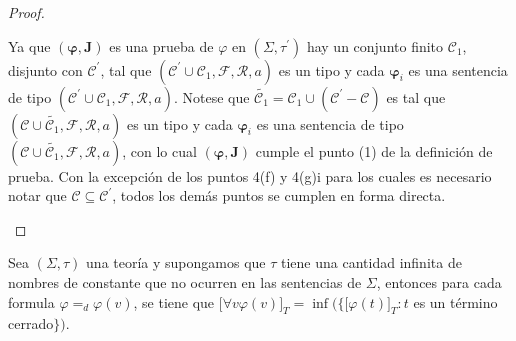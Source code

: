 \begin{proof}
\begin{enumerate}[(1)]
        \PN Ya que $(\mathbf{\varphi}, \mathbf{J})$ es una prueba de $\varphi$ en $(\Sigma, \tau^{\prime})$ hay un
        conjunto finito $\mathcal{C}_{1}$, disjunto con $\mathcal{C}^{\prime}$, tal que $(\mathcal{C}^{\prime} \cup
        \mathcal{C}_{1}, \mathcal{F}, \mathcal{R}, a)$ es un tipo y cada $\mathbf{\varphi}_{i}$ es una sentencia de tipo
        $(\mathcal{C}^{\prime} \cup \mathcal{C}_{1}, \mathcal{F}, \mathcal{R}, a)$. Notese que
        $\widetilde{\mathcal{C}_{1}} = \mathcal{C}_{1} \cup (\mathcal{C}^{\prime}-\mathcal{C})$ es tal que $(\mathcal{C}
        \cup \widetilde{\mathcal{C}_{1}}, \mathcal{F}, \mathcal{R}, a)$ es un tipo y cada $\mathbf{\varphi}_{i}$ es una
        sentencia de tipo $(\mathcal{C} \cup \widetilde{\mathcal{C}_{1}}, \mathcal{F}, \mathcal{R}, a)$, con lo cual
        $(\mathbf{\varphi}, \mathbf{J})$ cumple el punto (1) de la definición de prueba. Con la excepción de los puntos
        4(f) y 4(g)i para los cuales es necesario notar que $\mathcal{C} \subseteq \mathcal{C}^{\prime}$, todos los
        demás puntos se cumplen en forma directa.
    \end{enumerate}
  \end{proof}

  \begin{lemma} \label{lemma_79}
    \PN Sea $(\Sigma, \tau)$ una teoría y supongamos que $\tau$ tiene una cantidad infinita de nombres de constante que
    no ocurren en las sentencias de $\Sigma$, entonces para cada formula $\varphi =_{d} \varphi(v)$, se tiene que
    $\lbrack \forall v\varphi (v) \rbrack_{T} = \inf(\{\lbrack \varphi(t) \rbrack_{T}: t$ es un término cerrado$\})$.
  \end{lemma}

